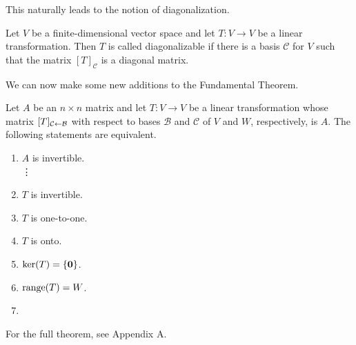 \documentclass[../m073main.tex]{subfiles}
\begin{document}
This naturally leads to the notion of diagonalization.

\begin{definition}
	Let $V$ be a finite-dimensional vector space and let $T : V \to V$ be a linear transformation.
	Then $T$ is called diagonalizable if there is a basis $\mathcal{C}$ for $V$ such that the matrix $[T]_{\mathcal{C}}$ is a diagonal matrix.
\end{definition}

We can now make some new additions to the Fundamental Theorem.

\begin{theorem}
	Let $A$ be an $n\times n$ matrix and let $T : V \to V$ be a linear transformation whose matrix $[T]_{\mathcal{C} \leftarrow \mathcal{B}}$ with respect to bases $\mathcal{B}$ and $\mathcal{C}$ of $V$ and $W$, respectively, is $A$.
	The following statements are equivalent.
	\begin{multicols}{2}
		\begin{enumerate}[label=(\alph*)]
			\item $A$ is invertible. \\
			\phantom{~}\hspace{-19.5pt} \vdots
			\setcounter{enumi}{15}
			\item $T$ is invertible.
			\item $T$ is one-to-one.
			\item $T$ is onto.
			\item $\textrm{ker}(T) = \{\mathbf{0}\}$.
			\item $\textrm{range}(T) = W$.
			\item[]
		\end{enumerate}
	\end{multicols}
	For the full theorem, see Appendix A.
\end{theorem}
\end{document}
